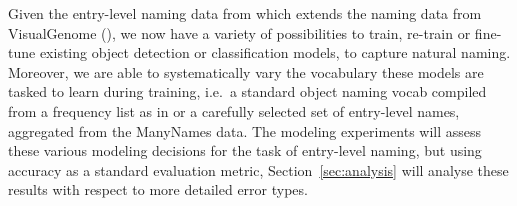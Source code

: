 
Given the entry-level naming data from \mn which extends the \arbitrary naming data from VisualGenome (\vg), we now have a variety of possibilities to train, re-train or fine-tune existing object detection or classification models, to capture natural naming.
Moreover, we are able to systematically vary the vocabulary these models are tasked to learn during training, i.e.\ a standard object naming vocab compiled from a frequency list as in \cite{anderson2018updown} or a carefully selected set of entry-level names, aggregated from the ManyNames data.
The modeling experiments will assess these various modeling decisions for the task of entry-level naming, but using accuracy as a standard evaluation metric,
Section~\ref{sec:analysis} will analyse these results with respect to more detailed error types.

